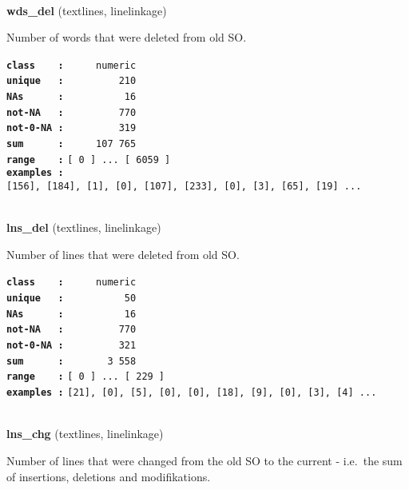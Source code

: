 \documentclass[]{article}
\begin{document}
~

\textbf{wds\_del} (textlines, linelinkage)

Number of words that were deleted from old SO.

\textbf{\texttt{class\ \ \ \ :}} \texttt{~~~~~numeric}\\
\textbf{\texttt{unique\ \ \ :}} \texttt{~~~~~~~~~210}\\
\textbf{\texttt{NAs\ \ \ \ \ \ :}} \texttt{~~~~~~~~~~16}\\
\textbf{\texttt{not-NA\ \ \ :}} \texttt{~~~~~~~~~770}\\
\textbf{\texttt{not-0-NA\ :}} \texttt{~~~~~~~~~319}\\
\textbf{\texttt{sum\ \ \ \ \ \ :}} \texttt{~~~~~107~765}\\
\textbf{\texttt{range\ \ \ \ :}}
\texttt{{[}\ 0\ {]}\ ...\ {[}\ 6059\ {]}}\\
\textbf{\texttt{examples\ :}}
\texttt{{[}156{]},\ {[}184{]},\ {[}1{]},\ {[}0{]},\ {[}107{]},\ {[}233{]},\ {[}0{]},\ {[}3{]},\ {[}65{]},\ {[}19{]}\ ...}\\

~

\textbf{lns\_del} (textlines, linelinkage)

Number of lines that were deleted from old SO.

\textbf{\texttt{class\ \ \ \ :}} \texttt{~~~~~numeric}\\
\textbf{\texttt{unique\ \ \ :}} \texttt{~~~~~~~~~~50}\\
\textbf{\texttt{NAs\ \ \ \ \ \ :}} \texttt{~~~~~~~~~~16}\\
\textbf{\texttt{not-NA\ \ \ :}} \texttt{~~~~~~~~~770}\\
\textbf{\texttt{not-0-NA\ :}} \texttt{~~~~~~~~~321}\\
\textbf{\texttt{sum\ \ \ \ \ \ :}} \texttt{~~~~~~~3~558}\\
\textbf{\texttt{range\ \ \ \ :}}
\texttt{{[}\ 0\ {]}\ ...\ {[}\ 229\ {]}}\\
\textbf{\texttt{examples\ :}}
\texttt{{[}21{]},\ {[}0{]},\ {[}5{]},\ {[}0{]},\ {[}0{]},\ {[}18{]},\ {[}9{]},\ {[}0{]},\ {[}3{]},\ {[}4{]}\ ...}\\

~

\textbf{lns\_chg} (textlines, linelinkage)

Number of lines that were changed from the old SO to the current -
i.e.~the sum of insertions, deletions and modifikations.
\end{document}
